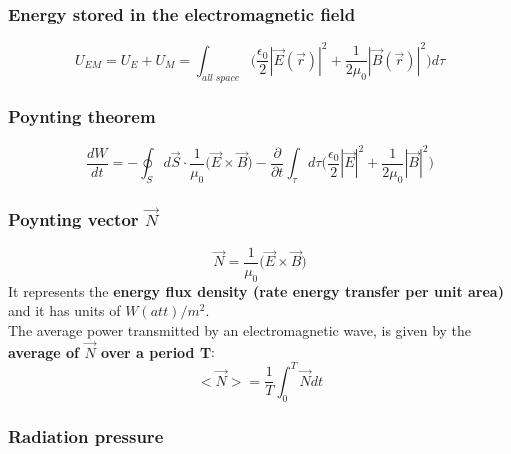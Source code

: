\documentclass[english,11pt]{article}
\begin{document}
\subsubsection*{\bf Energy stored in the electromagnetic field}

\begin{equation*}
   U_{EM} = U_{E} + U_{M} = \int_{all\;space} \Big(
     \frac{\epsilon_0}{2} |\vec{E}(\vec{r})|^2 + \frac{1}{2\mu_{0}} |\vec{B}(\vec{r})|^2
     \Big) d\tau
\end{equation*}


\subsubsection*{\bf Poynting theorem}

\begin{equation*}
  \frac{dW}{dt} =
     - \oint_{S} d\vec{S} \cdot \frac{1}{\mu_0} \Big(\vec{E} \times \vec{B} \Big)
     - \frac{\partial}{\partial t} \int_{\tau} d\tau  \Big( \frac{\epsilon_0}{2} |\vec{E}|^2 + \frac{1}{2\mu_0} |\vec{B}|^2 \Big)
\end{equation*}


\subsubsection*{\bf Poynting vector $\vec{N}$}

\begin{equation*}
  \vec{N} = \frac{1}{\mu_0} \Big( \vec{E} \times \vec{B} \Big)
\end{equation*}
It represents the {\bf energy flux density (rate energy transfer per unit area)} and it has units of $W(att)/m^2$.\\

The average power transmitted by an electromagnetic wave, is given by
the {\bf average of $\vec{N}$ over a period T}:
\begin{equation*}
  <\vec{N}> = \frac{1}{T} \int_{0}^{T} \vec{N} dt
\end{equation*}


\subsubsection*{\bf Radiation pressure}
\end{document}
